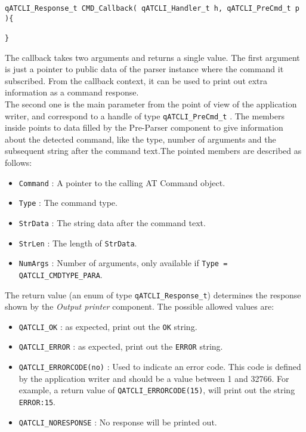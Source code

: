 \begin{lstlisting}[style=CStyle]
qATCLI_Response_t CMD_Callback( qATCLI_Handler_t h, qATCLI_PreCmd_t p ){
    
}
\end{lstlisting}

The callback takes two arguments and returns a single value. The first argument is just a pointer to public data of the parser instance where the command it subscribed. From the callback context, it can be used to print out extra information as a command response. \\

The second one is the main parameter from the point of view of the application writer, and correspond to a handle of type \lstinline{qATCLI_PreCmd_t} . The members inside points to data filled by the Pre-Parser component to give information about the detected command, like the type, number of arguments and the subsequent string after the command text.The pointed members are described as follows:

\begin{itemize}
    \item \lstinline{Command} : A pointer to the calling AT Command object.
    \item \lstinline{Type} : The command type.
    \item \lstinline{StrData} : The string data after the command text.
    \item \lstinline{StrLen} : The length of \lstinline{StrData}.
    \item \lstinline{NumArgs} : Number of arguments, only available if \lstinline{Type = QATCLI_CMDTYPE_PARA}.
\end{itemize}

The return value (an enum of type \lstinline{qATCLI_Response_t})  determines the response shown by the \textit{Output printer} component. The possible allowed values are:

\begin{itemize}
    \item \lstinline{QATCLI_OK} : as expected, print out the \lstinline{OK} string.
    \item \lstinline{QATCLI_ERROR} : as expected, print out the \lstinline{ERROR} string.
    \item \lstinline{QATCLI_ERRORCODE(no)} : Used to indicate an error code. This code is defined by the application writer and should be a value between 1 and 32766. For example, a return value of \lstinline{QATCLI_ERRORCODE(15)}, will print out the string \lstinline{ERROR:15}.
    \item \lstinline{QATCLI_NORESPONSE} : No response will be printed out.
\end{itemize}


